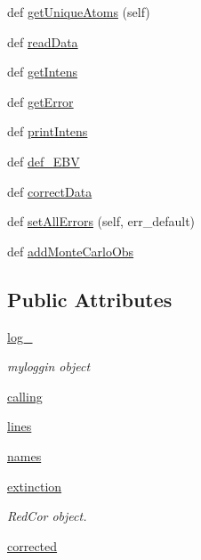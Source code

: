 \begin{DoxyCompactItemize}
\item 
def \hyperlink{classpyneb_1_1core_1_1pynebcore_1_1_observation_abe65e91f7abc06d2c525d6c1a3d05627}{get\+Unique\+Atoms} (self)
\item 
def \hyperlink{classpyneb_1_1core_1_1pynebcore_1_1_observation_aa33f35ce2f56f5b8a5666601b24a1107}{read\+Data}
\item 
def \hyperlink{classpyneb_1_1core_1_1pynebcore_1_1_observation_ac380b22660411926b90f935f5123494b}{get\+Intens}
\item 
def \hyperlink{classpyneb_1_1core_1_1pynebcore_1_1_observation_a96cf2360b9b568a675d2c8177d47b3d2}{get\+Error}
\item 
def \hyperlink{classpyneb_1_1core_1_1pynebcore_1_1_observation_aa3d4a178539eaf7fe431ef1dbd347430}{print\+Intens}
\item 
def \hyperlink{classpyneb_1_1core_1_1pynebcore_1_1_observation_ab01150e82809bd712a1b1f09d250db94}{def\+\_\+\+E\+B\+V}
\item 
def \hyperlink{classpyneb_1_1core_1_1pynebcore_1_1_observation_a823a1fa51f042f2734cbc323c6a7d4bb}{correct\+Data}
\item 
def \hyperlink{classpyneb_1_1core_1_1pynebcore_1_1_observation_aa0f98ae4395e7dfa586bcd71d32e43f1}{set\+All\+Errors} (self, err\+\_\+default)
\item 
def \hyperlink{classpyneb_1_1core_1_1pynebcore_1_1_observation_a8005a1ad8167e96e117d4b81d6e919ff}{add\+Monte\+Carlo\+Obs}
\end{DoxyCompactItemize}
\subsection*{Public Attributes}
\begin{DoxyCompactItemize}
\item 
\hyperlink{classpyneb_1_1core_1_1pynebcore_1_1_observation_a882b7909bc881e0c212dd5085305f4d4}{log\+\_\+}
\begin{DoxyCompactList}\small\item\em myloggin object \end{DoxyCompactList}\item 
\hyperlink{classpyneb_1_1core_1_1pynebcore_1_1_observation_a2639fad9af4fefad20e4097295bd40e7}{calling}
\item 
\hyperlink{classpyneb_1_1core_1_1pynebcore_1_1_observation_a78332043ca9f290590edf6b8a1e5b767}{lines}
\item 
\hyperlink{classpyneb_1_1core_1_1pynebcore_1_1_observation_a3f365d0b1488b2eba300bf71caf23c17}{names}
\item 
\hyperlink{classpyneb_1_1core_1_1pynebcore_1_1_observation_acdd6227c32bd92ec4a15b83110bcb570}{extinction}
\begin{DoxyCompactList}\small\item\em Red\+Cor object. \end{DoxyCompactList}\item 
\hyperlink{classpyneb_1_1core_1_1pynebcore_1_1_observation_a7eef3176d082009fa850a9d364d44625}{corrected}
\end{DoxyCompactItemize}
